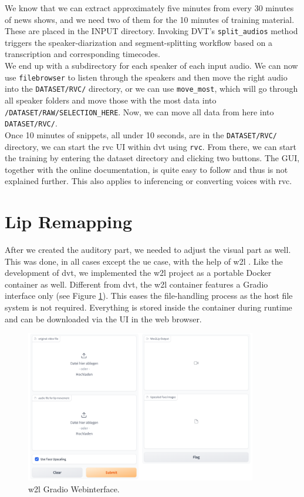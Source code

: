 \documentclass[
  a4paper,  %
  twoside,  %
  bibliography=totoc,
  headsepline,
  cleardoublepage=empty,
  parskip=half,
  draft=false
]{scrbook}
\begin{document}
We know that we can extract approximately five minutes from every 30 minutes of news shows, and we need two of them for the 10 minutes of training material. These are placed in the INPUT directory. Invoking DVT's \verb|split_audios| method triggers the speaker-diarization and segment-splitting workflow based on a transcription and corresponding timecodes. \\
We end up with a subdirectory for each speaker of each input audio. We can now use \verb|filebrowser| to listen through the speakers and then move the right audio into the \verb|DATASET/RVC/| directory, or we can use \verb|move_most|, which will go through all speaker folders and move those with the most data into \verb|/DATASET/RAW/SELECTION_HERE|. Now, we can move all data from here into \verb|DATASET/RVC/|. \\
Once 10 minutes of snippets, all under 10 seconds, are in the \verb|DATASET/RVC/| directory, we can start the \gls{rvc} UI within \gls{dvt} using \verb|rvc|. From there, we can start the training by entering the dataset directory and clicking two buttons. The GUI, together with the online documentation, is quite easy to follow and thus is not explained further. This also applies to inferencing or converting voices with \gls{rvc}.

\section{Lip Remapping}
 After we created the auditory part, we needed to adjust the visual part as well. This was done, in all cases except the \gls{ue} case, with the help of \gls{w2l} \cite{mukhopadhyayWav2LipAccuratelyLipsyncing2023}. Like the development of \gls{dvt}, we implemented the \gls{w2l} project as a portable Docker container as well. Different from \gls{dvt}, the \gls{w2l} container features a Gradio interface only (see Figure \ref{fig:w2l-gradio}). This eases the file-handling process as the host file system is not required. Everything is stored inside the container during runtime and can be downloaded via the UI in the web browser.
 \begin{figure}[h]

  \centering
  \includegraphics[width=0.9\textwidth]{./graphics/wav2lip/w2l-gradio.png}
  \caption{\gls{w2l} Gradio Webinterface.}
  \label{fig:w2l-gradio}
\end{figure}
\end{document}
